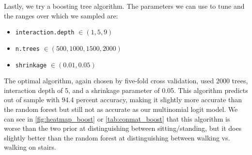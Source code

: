 Lastly, we try a boosting tree algorithm. The parameters we can use to tune and the ranges over which we sampled are:
\begin{itemize}
\item \texttt{interaction.depth} $\in (1, 5, 9)$
\item \texttt{n.trees} $\in (500, 1000, 1500, 2000)$
\item \texttt{shrinkage} $\in (0.01, 0.05)$
\end{itemize}
The optimal algorithm, again chosen by five-fold cross validation, used 2000 trees, interaction depth of 5, and a shrinkage parameter of 0.05. This algorithm predicts out of sample with 94.4 percent accuracy, making it slightly more accurate than the random forest but still not as accurate as our multinomial logit model. We can see in \cref{fig:heatmap_boost} or \cref{tab:conmat_boost} that this algorithm is worse than the two prior at distinguishing between sitting/standing, but it does slightly better than the random forest at distinguishing between walking vs. walking on stairs.

